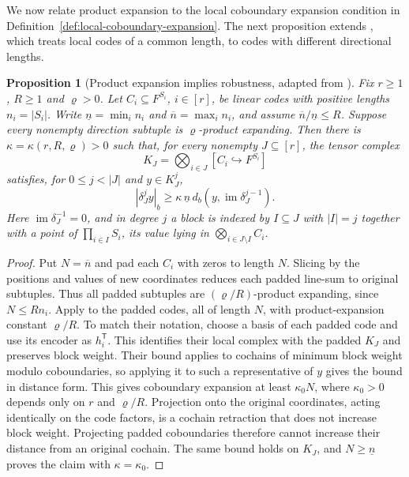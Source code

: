 \documentclass[11pt,letterpaper]{article}
\renewcommand{\le}{\leqslant}
\renewcommand{\ge}{\geqslant}
\newtheorem{proposition}[theorem]{Proposition}
\theoremstyle{definition}
\theoremstyle{remark}
\newcommand{\im}{\operatorname{im}}
\newcommand{\db}{d_b}
\begin{document}
We now relate product expansion to the local coboundary expansion
condition in Definition~\ref{def:local-coboundary-expansion}.
The next proposition extends
\cite[Lemma~5.13]{DinurLinVidick2024}, which treats local codes of a
common length, to codes with different directional lengths.

\begin{proposition}[Product expansion implies robustness,
adapted from {\cite[Lemma~5.13]{DinurLinVidick2024}}]
\label{prop:product-robustness}
Fix $r\ge1$, $R\ge1$ and $\varrho>0$. Let $C_i\subseteq F^{S_i}$,
$i\in[r]$, be linear codes with positive lengths $n_i=|S_i|$.
Write $\underline n=\min_i n_i$ and $\overline n=\max_i n_i$, and assume
$\overline n/\underline n\le R$. Suppose every nonempty direction subtuple
is $\varrho$-product expanding. Then there is
$\kappa=\kappa(r,R,\varrho)>0$ such that, for every nonempty $J\subseteq[r]$,
the tensor complex
\[
 K_J=\bigotimes_{i\in J}[C_i\hookrightarrow F^{S_i}]
\]
satisfies, for $0\le j<|J|$ and $y\in K_J^j$,
\begin{equation}
 |\delta_J^j y|_b\ge
 \kappa\,\underline n\,\db(y,\im\delta_J^{j-1}).
 \label{eq:product-robustness}
\end{equation}
Here $\im\delta_J^{-1}=0$, and in degree $j$ a block is indexed by
$I\subseteq J$ with $|I|=j$ together with a point of
$\prod_{i\in I}S_i$, its value lying in
$\bigotimes_{i\in J\setminus I}C_i$.
\end{proposition}
\begin{proof}
Put $N=\overline n$ and pad each $C_i$ with zeros to length $N$.
Slicing by the positions and values of new coordinates reduces
each padded line-sum to original subtuples. Thus all padded
subtuples are $(\varrho/R)$-product expanding, since $N\le Rn_i$.
Apply \cite[Lemma~5.13]{DinurLinVidick2024} to the padded codes,
all of length $N$, with product-expansion constant $\varrho/R$.
To match their notation, choose a basis of each padded code and use
its encoder as $h_i^{\mathsf T}$. This identifies their local complex
with the padded $K_J$ and preserves block weight.
Their bound applies to cochains of minimum block weight modulo
coboundaries, so applying it to such a representative of $y$ gives
the bound in distance form.
This gives coboundary expansion at least $\kappa_0N$, where
$\kappa_0>0$ depends only on $r$ and $\varrho/R$.
Projection onto the original coordinates, acting
identically on the code factors, is a cochain retraction that
does not increase block weight. Projecting padded coboundaries
therefore cannot increase their distance from an original cochain.
The same bound holds on $K_J$, and $N\ge\underline n$ proves
the claim with $\kappa=\kappa_0$.
\end{proof}
\end{document}
